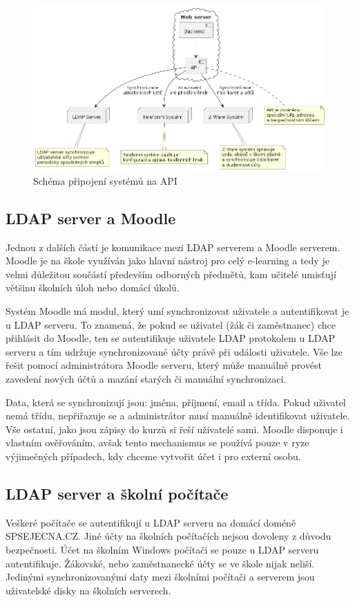 \documentclass[FM,Proj]{tulthesis}
\begin{document}
\begin{figure}[H]
    \includegraphics[width=\textwidth-28pt]{backend-api.png}
    \caption{Schéma připojení systémů na API}
    \label{fig:backend-api}
\end{figure}

\subsection{LDAP server a Moodle}
\label{section:ldap-server-a-moodle}
Jednou z dalších částí je komunikace mezi LDAP serverem a Moodle serverem. Moodle je na škole
využíván jako hlavní nástroj pro celý e-learning a tedy je velmi důležitou součástí především
odborných předmětů, kam učitelé umisťují většinu školních úloh nebo domácí úkolů.

Systém Moodle má modul, který umí synchronizovat uživatele a autentifikovat je u LDAP serveru.
To znamená, že pokud se uživatel (žák či zaměstnanec) chce přihlásit do Moodle, ten se 
autentifikuje uživatele LDAP protokolem u LDAP serveru a tím udržuje synchronizované účty právě
při události uživatele.
Vše lze řešit pomocí administrátora Moodle serveru, který může manuálně provést zavedení 
nových účtů a mazání starých či manuální synchronizaci.

Data, která se synchronizují jsou: jména, příjmení, email a třída. Pokud uživatel nemá třídu,
nepřiřazuje se a administrátor musí manuálně identifikovat uživatele. Vše ostatní, jako jsou 
zápisy do kurzů si řeší uživatelé sami. Moodle disponuje i vlastním ověřováním, avšak tento
mechanismus se používá pouze  v ryze výjimečných případech, kdy chceme vytvořit účet i pro 
externí osobu.

\subsection{LDAP server a školní počítače}
\label{section:ldap-server-a-skolni-pocitace}
Veškeré počítače se autentifikují u LDAP serveru na domácí doméně SPSEJECNA.CZ. Jiné účty
na školních počítačích nejsou dovoleny z důvodu bezpečnosti.
Účet na školním Windows počítači se pouze u LDAP serveru autentifikuje. Žákovské, nebo
zaměstnanecké účty se ve škole nijak neliší. Jedinými synchronizovanými daty mezi školními
počítači a serverem jsou uživatelské disky na školních serverech.
\end{document}
